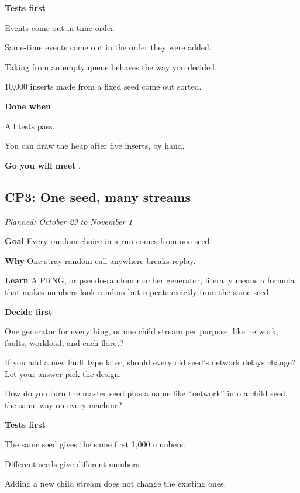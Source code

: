 \documentclass[11pt,letterpaper]{article}
\newcommand{\code}[1]{\texttt{\detokenize{#1}}}
\newcommand{\lbl}[1]{\textbf{#1}\enspace}
\newcommand{\when}[1]{\par\textit{Planned: #1}\par}
\begin{document}
\lbl{Tests first}
\begin{checks}
  \item Events come out in time order.
  \item Same-time events come out in the order they were added.
  \item Taking from an empty queue behaves the way you decided.
  \item 10,000 inserts made from a fixed seed come out sorted.
\end{checks}

\lbl{Done when}
\begin{checks}
  \item All tests pass.
  \item You can draw the heap after five inserts, by hand.
\end{checks}

\lbl{Go you will meet} \code{container/heap}.

\subsection{CP3: One seed, many streams}
\when{October 29 to November 1}

\lbl{Goal} Every random choice in a run comes from one seed.

\lbl{Why} One stray random call anywhere breaks replay.

\lbl{Learn} A PRNG, or pseudo-random number generator, literally means a formula that makes numbers look random but repeats exactly from the same seed.

\lbl{Decide first}
\begin{asks}
  \item One generator for everything, or one child stream per purpose, like network, faults, workload, and each floret?
  \item If you add a new fault type later, should every old seed's network delays change? Let your answer pick the design.
  \item How do you turn the master seed plus a name like ``network'' into a child seed, the same way on every machine?
\end{asks}

\lbl{Tests first}
\begin{checks}
  \item The same seed gives the same first 1,000 numbers.
  \item Different seeds give different numbers.
  \item Adding a new child stream does not change the existing ones.
\end{checks}
\end{document}
